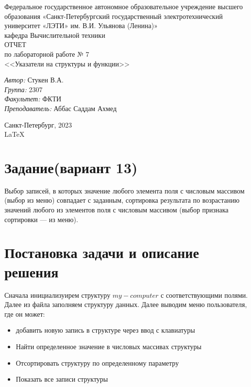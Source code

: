 \documentclass[a4paper,12pt]{report}
\begin{document}
 

\begin{titlepage} 

\begin{center} 

\large Федеральное государственное автономное образовательное учреждение высшего образования «Санкт-Петербургский государственный электротехнический университет «ЛЭТИ» им. В.И. Ульянова (Ленина)»\\
кафедра Вычислительной техники\\[5cm] 

\huge ОТЧЕТ\\ по лабораторной работе № 7\\[0.5cm] 
\large <<Указатели на структуры и функции>>\\[3.7cm]

\begin{minipage}{1\textwidth}
    \begin{flushleft}
        \emph{Автор:} Стукен В.А.\\
        \emph{Группа:} 2307\\
        \emph{Факультет:} ФКТИ\\
        \emph{Преподаватель:} Аббас Саддам Ахмед\\
    \end{flushleft}
\end{minipage}

\vfill

Санкт-Петербург, 2023\\
{\large \LaTeX}

\end{center}
\thispagestyle{empty}
\end{titlepage}

\section*{Задание(вариант 13)}
Выбор записей, в которых значение любого элемента поля с числовым массивом (выбор из меню) совпадает с заданным, сортировка результата по возрастанию значений любого из элементов поля с числовым массивом (выбор признака сортировки — из меню).

\section*{Постановка задачи и описание решения}
\par

Сначала инициализуирем структуру $my-computer$ с соответствующими полями. Далее из файла заполняем структуру данных.
Далее выводим меню пользователя, где он может:
\begin{itemize}
    \item добавить новую запись в структуре через ввод с клавиатуры
    \item Найти определенное значение в числовых массивах структуры
    \item Отсортировать структуру по определенному параметру
    \item Показать все записи структуры
\end{itemize}
\end{document}
